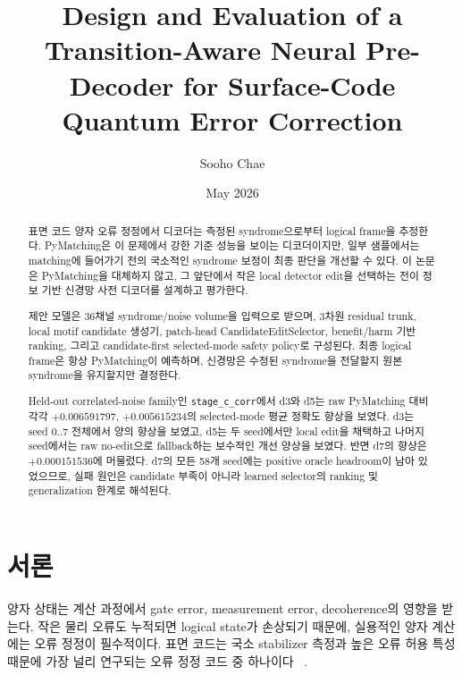 \documentclass[aps,prd,12pt,twocolumn,superscriptaddress,showkeys,floatfix]{revtex4-2}
\begin{document}
\title{Design and Evaluation of a Transition-Aware Neural Pre-Decoder for Surface-Code Quantum Error Correction}
\author{Sooho Chae}
\noaffiliation
\date{May 2026}

\begin{abstract}
표면 코드 양자 오류 정정에서 디코더는 측정된 syndrome으로부터 logical
frame을 추정한다. PyMatching은 이 문제에서 강한 기준 성능을 보이는
디코더이지만, 일부 샘플에서는 matching에 들어가기 전의 국소적인 syndrome
보정이 최종 판단을 개선할 수 있다. 이 논문은 PyMatching을 대체하지 않고,
그 앞단에서 작은 local detector edit을 선택하는 전이 정보 기반 신경망 사전
디코더를 설계하고 평가한다.

제안 모델은 36채널 syndrome/noise volume을 입력으로 받으며, 3차원 residual
trunk, local motif candidate 생성기, patch-head CandidateEditSelector,
benefit/harm 기반 ranking, 그리고 candidate-first selected-mode safety
policy로 구성된다. 최종 logical frame은 항상 PyMatching이 예측하며,
신경망은 수정된 syndrome을 전달할지 원본 syndrome을 유지할지만 결정한다.

Held-out correlated-noise family인 \texttt{stage\_c\_corr}에서 d3와 d5는 raw
PyMatching 대비 각각 \(+0.006591797\), \(+0.005615234\)의 selected-mode 평균
정확도 향상을 보였다. d3는 seed \(0..7\) 전체에서 양의 향상을 보였고, d5는
두 seed에서만 local edit을 채택하고 나머지 seed에서는 raw no-edit으로
fallback하는 보수적인 개선 양상을 보였다. 반면 d7의 향상은
\(+0.000151536\)에 머물렀다. d7의 모든 58개 seed에는 positive oracle
headroom이 남아 있었으므로, 실패 원인은 candidate 부족이 아니라 learned
selector의 ranking 및 generalization 한계로 해석된다.
\end{abstract}


\maketitle

\section{서론}

양자 상태는 계산 과정에서 gate error, measurement error, decoherence의 영향을
받는다. 작은 물리 오류도 누적되면 logical state가 손상되기 때문에, 실용적인
양자 계산에는 오류 정정이 필수적이다. 표면 코드는 국소 stabilizer 측정과
높은 오류 허용 특성 때문에 가장 널리 연구되는 오류 정정 코드 중 하나이다
~\cite{surfacecode}.
\end{document}
